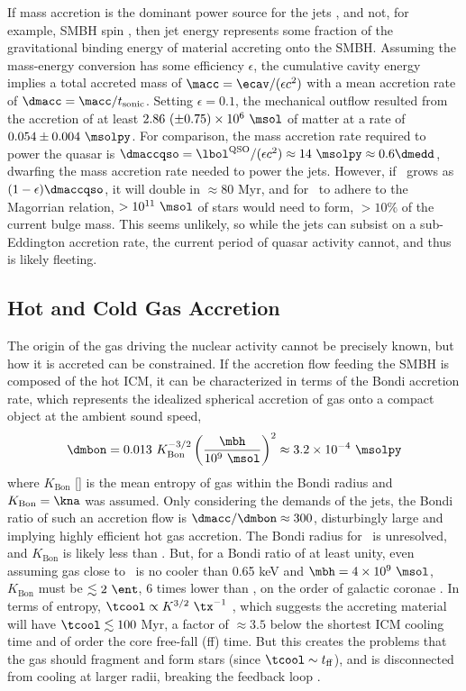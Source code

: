 \documentclass[useAMS,usenatbib]{mn2e}
\begin{document}
If mass accretion is the dominant power source for the jets
\citep{1984RvMP...56..255B}, and not, for example, SMBH spin
\citep{2002NewAR..46..247M}, then jet energy represents some fraction
of the gravitational binding energy of material accreting onto the
SMBH. Assuming the mass-energy conversion has some efficiency
$\epsilon$, the cumulative cavity energy implies a total accreted mass
of $\macc = \ecav/(\epsilon c^2)$ with a mean accretion rate of
$\dmacc = \macc/t_{\mathrm{sonic}}$. Setting $\epsilon = 0.1$, the
mechanical outflow resulted from the accretion of at least $2.86 ~(\pm
0.75) \times 10^{6} ~\msol$ of matter at a rate of $0.054 \pm 0.004
~\msolpy$. For comparison, the mass accretion rate required to power
the quasar is $\dmaccqso = \lqso/(\epsilon c^2) \approx 14 ~\msolpy
\approx 0.6 \dmedd$, dwarfing the mass accretion rate needed to power
the jets. However, if \mbh\ grows as $(1-\epsilon) \dmaccqso$, it will
double in $\approx 80$ Myr, and for \irs\ to adhere to the Magorrian
relation, $> 10^{11} ~\msol$ of stars would need to form, $> 10\%$ of
the current bulge mass. This seems unlikely, so while the jets can
subsist on a sub-Eddington accretion rate, the current period of
quasar activity cannot, and thus is likely fleeting.

\subsection{Hot and Cold Gas Accretion}

The origin of the gas driving the nuclear activity cannot be precisely
known, but how it is accreted can be constrained. If the accretion
flow feeding the SMBH is composed of the hot ICM, it can be
characterized in terms of the Bondi accretion rate, which represents
the idealized spherical accretion of gas onto a compact object at the
ambient sound speed,
\begin{equation}
  \dmbon = 0.013 ~K_{\mathrm{Bon}}^{-3/2} \left(\frac{\mbh}{10^9
    ~\msol}\right)^{2} \approx 3.2 \times 10^{-4} ~\msolpy
\end{equation}
where $K_{\mathrm{Bon}}$ [\ent] is the mean entropy of gas within the
Bondi radius and $K_{\mathrm{Bon}} = \kna$ was assumed. Only
considering the demands of the jets, the Bondi ratio of such an
accretion flow is $\dmacc/\dmbon \approx 300$, disturbingly large and
implying highly efficient hot gas accretion. The Bondi radius for
\irs\ is unresolved, and $K_{\mathrm{Bon}}$ is likely less than
\kna. But, for a Bondi ratio of at least unity, even assuming gas
close to \rbon\ is no cooler than 0.65 keV and $\mbh = 4 \times 10^9
~\msol$, $K_{\mathrm{Bon}}$ must be $\la 2 ~\ent$, 6 times lower than
\kna, on the order of galactic coronae \citep{coronae}. In terms of
entropy, $\tcool \propto K^{3/2} ~\tx^{-1}$ \citep{d06}, which
suggests the accreting material will have $\tcool \la 100$ Myr, a
factor of $\approx 3.5$ below the shortest ICM cooling time and of
order the core free-fall (ff) time. But this creates the problems that
the gas should fragment and form stars (since $\tcool \sim
t_{\rm{ff}}$), and is disconnected from cooling at larger radii,
breaking the feedback loop \citep{2006NewA...12...38S}.
\end{document}
